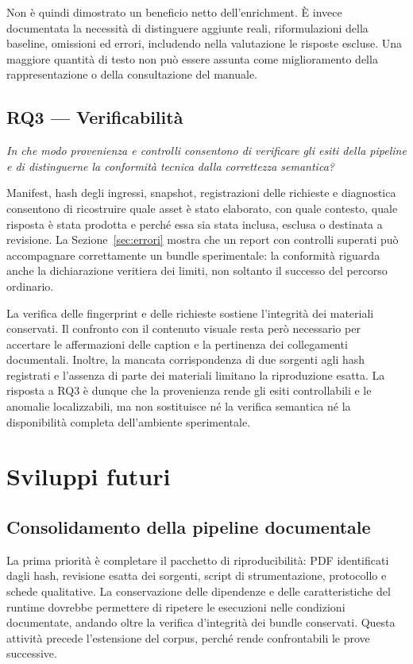 Non è quindi dimostrato un beneficio netto dell'enrichment. È invece documentata la necessità di distinguere aggiunte reali, riformulazioni della baseline, omissioni ed errori, includendo nella valutazione le risposte escluse. Una maggiore quantità di testo non può essere assunta come miglioramento della rappresentazione o della consultazione del manuale.

\subsection{RQ3 --- Verificabilità}

\emph{In che modo provenienza e controlli consentono di verificare gli esiti della pipeline e di distinguerne la conformità tecnica dalla correttezza semantica?}

Manifest, hash degli ingressi, snapshot, registrazioni delle richieste e diagnostica consentono di ricostruire quale asset è stato elaborato, con quale contesto, quale risposta è stata prodotta e perché essa sia stata inclusa, esclusa o destinata a revisione. La Sezione~\ref{sec:errori} mostra che un report con controlli superati può accompagnare correttamente un bundle sperimentale: la conformità riguarda anche la dichiarazione veritiera dei limiti, non soltanto il successo del percorso ordinario.

La verifica delle fingerprint e delle richieste sostiene l'integrità dei materiali conservati. Il confronto con il contenuto visuale resta però necessario per accertare le affermazioni delle caption e la pertinenza dei collegamenti documentali. Inoltre, la mancata corrispondenza di due sorgenti agli hash registrati e l'assenza di parte dei materiali limitano la riproduzione esatta. La risposta a RQ3 è dunque che la provenienza rende gli esiti controllabili e le anomalie localizzabili, ma non sostituisce né la verifica semantica né la disponibilità completa dell'ambiente sperimentale.

\section{Sviluppi futuri}

\subsection{Consolidamento della pipeline documentale}

La prima priorità è completare il pacchetto di riproducibilità: PDF identificati dagli hash, revisione esatta dei sorgenti, script di strumentazione, protocollo e schede qualitative. La conservazione delle dipendenze e delle caratteristiche del runtime dovrebbe permettere di ripetere le esecuzioni nelle condizioni documentate, andando oltre la verifica d'integrità dei bundle conservati. Questa attività precede l'estensione del corpus, perché rende confrontabili le prove successive.

